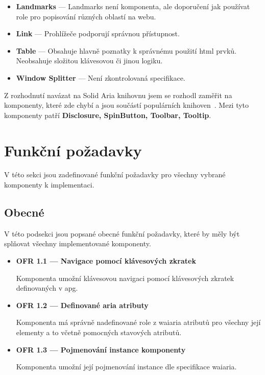 \begin{itemize}
    \item \textbf{Landmarks} --- Landmarks není komponenta, ale doporučení jak používat role pro popisování různých oblastí na webu.
    \item \textbf{Link} --- Prohlížeče podporují správnou přístupnost.
    \item \textbf{Table} --- Obsahuje hlavně poznatky k správnému použití \gls{html} prvků. Neobsahuje složitou klávesovou či jinou logiku.
    \item \textbf{Window Splitter} --- Není zkontrolovaná specifikace.
\end{itemize}

Z rozhodnutí navázat na Solid Aria knihovnu jsem se rozhodl zaměřit na komponenty, které zde chybí a jsou součástí populárních knihoven~\cite{react-aria,chakra}.
Mezi tyto komponenty patří \textbf{Disclosure, SpinButton, Toolbar, Tooltip}.

\section{Funkční požadavky}

V této sekci jsou zadefinované funkční požadavky pro všechny vybrané komponenty k implementaci.

\subsection{Obecné}

V této podsekci jsou popsané obecné funkční požadavky, které by měly být splňovat všechny implementované komponenty.

\begin{itemize}
    \item \textbf{OFR 1.1 --- Navigace pomocí klávesových zkratek}\label{ofr11}

          Komponenta umožní klávesovou navigaci pomocí klávesových zkratek definovaných v \gls{apg}.

    \item \textbf{OFR 1.2 --- Definované aria atributy}\label{ofr12}

          Komponenta má správně nadefinované role z \gls{waiaria} atributů pro všechny její elementy a to včetně pomocných stavových atributů.

    \item \textbf{OFR 1.3 --- Pojmenování instance komponenty}\label{ofr13}

          Komponenta umožní její pojmenování instance dle specifikace \gls{waiaria}.
\end{itemize}

